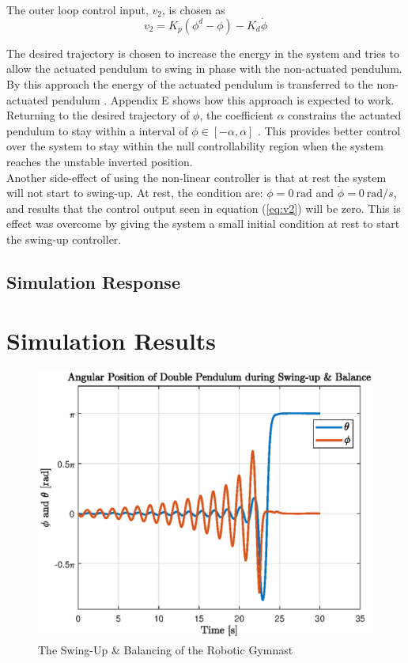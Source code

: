 The outer loop control input, $v_{2}$, is chosen as 
\begin{equation} \label{eq:v2}
v_{2} = K_{p}(\phi^{d}-\phi)-K_{d}\dot{\phi}
\end{equation}

The desired trajectory is chosen to increase the energy in the system and tries to allow the actuated pendulum to swing in phase with the non-actuated pendulum. By this approach the energy of the actuated pendulum is transferred to the non-actuated pendulum \cite{spong_swingup}. Appendix E shows how this approach is expected to work.\\

Returning to the desired trajectory of $\phi$, the coefficient $\alpha$ constrains the actuated pendulum to stay within a interval of $ \phi \in [-\alpha,\alpha] $ \cite{spong_swingup}. This provides better control over the system to stay within the null controllability region when the system reaches the unstable inverted position.\\

Another side-effect of using the non-linear controller is that at rest the system will not start to swing-up. At rest, the condition are: $\phi = \SI{0}{\radian}$ and $\dot{\phi} = \SI{0}{\radian/s}$, and results that the control output seen in equation (\ref{eq:v2}) will be zero. This is effect was overcome by giving the system a small initial condition at rest to start the swing-up controller.


\subsection{Simulation Response}



\section{Simulation Results}
\begin{figure}[h]
	\centering
	\includegraphics[scale=1]{./figs/swingup_balance}
	\caption{The Swing-Up \& Balancing of the Robotic Gymnast}
	\label{fig:swingup_balance}
\end{figure}